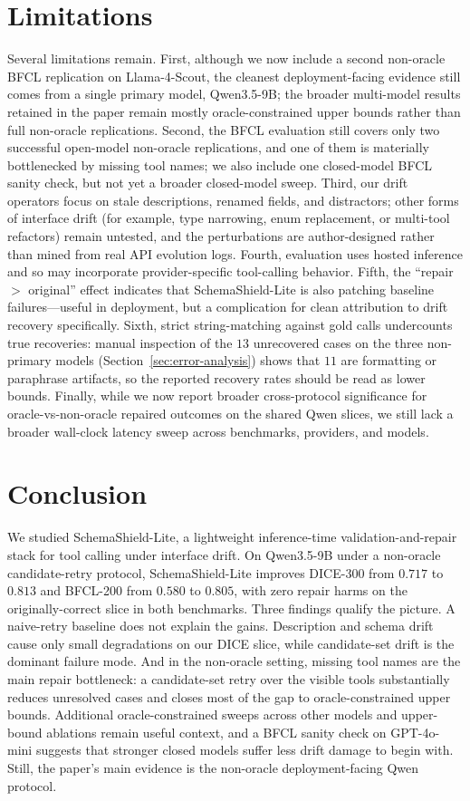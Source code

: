 \documentclass[runningheads]{llncs}
\newcommand{\method}{SchemaShield-Lite\xspace}
\begin{document}
\section{Limitations}
Several limitations remain. First, although we now include a second non-oracle
BFCL replication on Llama-4-Scout, the cleanest deployment-facing evidence still
comes from a single primary model, Qwen3.5-9B; the broader multi-model results
retained in the paper remain mostly oracle-constrained upper bounds rather than
full non-oracle replications. Second, the BFCL evaluation still covers only two
successful open-model non-oracle replications, and one of them is materially
bottlenecked by missing tool names; we also include one closed-model BFCL sanity
check, but not yet a broader closed-model sweep. Third, our drift operators focus on stale
descriptions, renamed fields, and distractors; other forms of interface drift
(for example, type narrowing, enum replacement, or multi-tool refactors) remain
untested, and the perturbations are author-designed rather than mined from real
API evolution logs. Fourth, evaluation uses hosted inference and so may incorporate
provider-specific tool-calling behavior. Fifth, the ``repair $>$ original''
effect indicates that \method is also patching baseline failures---useful in
deployment, but a complication for clean attribution to drift recovery
specifically. Sixth, strict string-matching against gold calls undercounts true
recoveries: manual inspection of the $13$ unrecovered cases on the three
non-primary models (Section~\ref{sec:error-analysis}) shows that $11$ are
formatting or paraphrase artifacts, so the reported recovery rates should be
read as lower bounds. Finally, while we now report broader cross-protocol
significance for oracle-vs-non-oracle repaired outcomes on the shared Qwen slices,
we still lack a broader wall-clock latency sweep across benchmarks, providers, and
models.

\section{Conclusion}
We studied \method, a lightweight inference-time validation-and-repair stack for
tool calling under interface drift. On Qwen3.5-9B under a non-oracle candidate-retry protocol,
\method improves DICE-300 from $0.717$ to $0.813$ and BFCL-200 from $0.580$ to
$0.805$, with zero repair harms on the originally-correct slice in both
benchmarks. Three findings qualify the picture. A naive-retry baseline does not
explain the gains. Description and schema drift cause only small degradations on
our DICE slice, while candidate-set drift is the dominant failure mode. And in the
non-oracle setting, missing tool names are the main repair bottleneck: a
candidate-set retry over the visible tools substantially reduces unresolved cases
and closes most of the gap to oracle-constrained upper bounds. Additional
oracle-constrained sweeps across other models and upper-bound ablations remain
useful context, and a BFCL sanity check on GPT-4o-mini suggests that stronger
closed models suffer less drift damage to begin with. Still, the paper's main
evidence is the non-oracle deployment-facing Qwen protocol.



\end{document}
